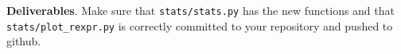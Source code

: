 \begin{fullwidth}


\begin{callout}{\bcplume}
{\bf Deliverables}. Make sure that {\tt stats/stats.py} has the new functions and that {\tt stats/plot\_rexpr.py} is correctly committed to your repository and pushed to github. 
\end{callout}

\end{fullwidth}
